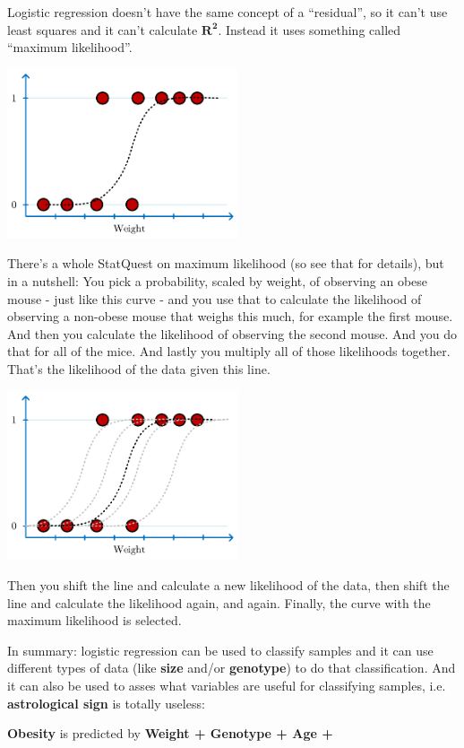 \documentclass[
	final,
	a4paper,
	oneside,
	parskip=full,
	headings=standardclasses,
	headings=big,
	pointednumbers
]{scrartcl}
\newcommand{\tb}[1]{\textbf{#1}}
\newcommand{\tcrossr}[1]{\tcrossc[#1][red]}
\begin{document}
    Logistic regression doesn't have the same concept of a ``residual'', so it can't use
    least squares and it can't calculate $\bm{R^2}$. Instead it uses something called
    ``maximum likelihood''.

    \begin{center}
        \includegraphics[height=5cm]{StatQuest_Logistic_Regression_Logistic_Boolean.pdf}
    \end{center}

    There's a whole StatQuest on maximum likelihood (so see that for details),
    but in a nutshell: You pick a probability, scaled by weight, of observing an obese mouse - just like
    this curve - and you use that to calculate the likelihood of observing a non-obese mouse that
    weighs this much, for example the first mouse. And then you calculate the likelihood of observing the
    second mouse. And you do that for all of the mice. And lastly you multiply all of those likelihoods
    together. That's the likelihood of the data given this line.

    \begin{center}
        \includegraphics[height=5cm]{StatQuest_Logistic_Regression_MaxLikeli.pdf}
    \end{center}

    Then you shift the line and calculate a new likelihood of the data, then shift the line
    and calculate the likelihood again, and again. Finally, the curve with the maximum likelihood
    is selected.

    In summary: logistic regression can be used to classify samples and it can use different
    types of data (like \tb{size} and/or \tb{genotype}) to do that classification. And it
    can also be used to asses what variables are useful for classifying samples, i.e.
    \tb{astrological sign} is totally useless:

    \tb{Obesity} is predicted by \tb{Weight + Genotype + Age + \tcrossr{Astrological Sign}}
\end{document}
